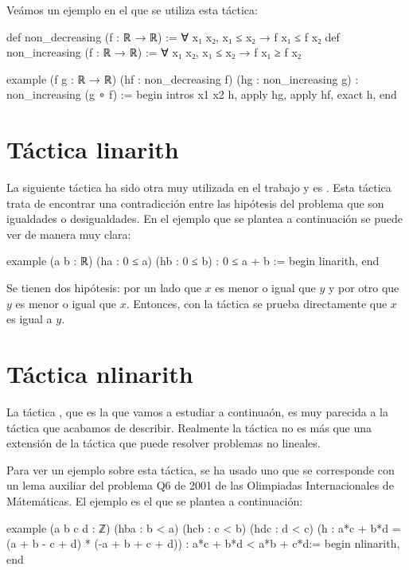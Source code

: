 Veámos un ejemplo en el que se utiliza esta táctica:
\begin{leancode}
def non_decreasing (f : ℝ → ℝ) := ∀ x₁ x₂, x₁ ≤ x₂ → f x₁ ≤ f x₂
def non_increasing (f : ℝ → ℝ) := ∀ x₁ x₂, x₁ ≤ x₂ → f x₁ ≥ f x₂

example (f g : ℝ → ℝ) (hf : non_decreasing f) (hg : non_increasing g) : 
non_increasing (g ∘ f) :=
begin
  intros x1 x2 h,
  apply hg,
  apply hf,
  exact h,
end
\end{leancode}


\section{Táctica linarith}
La siguiente táctica ha sido otra muy utilizada en el trabajo y es
. Esta táctica trata de encontrar una contradicción
entre las hipótesis del problema que son igualdades o desigualdades. En el
ejemplo que se plantea a continuación se puede ver de manera muy clara:

\begin{leancode}
example (a b : ℝ) (ha : 0 ≤ a) (hb : 0 ≤ b) : 0 ≤ a + b :=
begin
  linarith,
end
\end{leancode}

Se tienen dos hipótesis: por un lado que \(x\) es menor o igual que \(y\) y por
otro que \(y\) es menor o igual que \(x\). Entonces, con la táctica
 se prueba directamente que \(x\) es igual a \(y\).

\section{Táctica nlinarith}
La táctica , que es la que vamos a estudiar a
continuaón, es muy parecida a la táctica  que
acabamos de describir. Realmente la táctica  no
es más que una extensión de la táctica  que puede
resolver problemas no lineales.

Para ver un ejemplo sobre esta táctica, se ha usado uno que se corresponde con
un lema auxiliar del problema Q6 de 2001 de las Olimpiadas Internacionales de
Mátemáticas. El ejemplo es el que se plantea a continuación:

\begin{leancode}
example (a b c d : ℤ)
  (hba : b < a)
  (hcb : c < b)
  (hdc : d < c)
  (h : a*c + b*d = (a + b - c + d) * (-a + b + c + d))
  : a*c + b*d < a*b + c*d:=
begin
  nlinarith,
end
\end{leancode}

